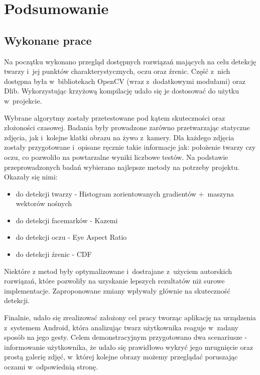 \newpage

\section{Podsumowanie}

\subsection{Wykonane prace}

Na początku wykonano przegląd dostępnych rozwiązań mających na celu detekcję twarzy i~jej punktów charakterystycznych, oczu oraz źrenic. Część z~nich dostępna była w~bibliotekach OpenCV (wraz z~dodatkowymi modułami) oraz Dlib. Wykorzystując krzyżową kompilację udało się je dostosować do użytku w~projekcie.

\par

Wybrane algorytmy zostały przetestowane pod kątem skuteczności oraz złożoności czasowej. Badania były prowadzone zarówno przetwarzając statyczne zdjęcia, jak i~kolejne klatki obrazu na żywo z~kamery. Dla każdego zdjęcia zostały przygotowane i~opisane ręcznie takie informacje jak: położenie twarzy czy oczu, co pozwoliło na powtarzalne wyniki liczbowe testów. Na podstawie przeprowadzonych badań wybierano najlepsze metody na potrzeby projektu. Okazały się nimi:

\begin{itemize}
    \item do detekcji twarzy - Histogram zorientowanych gradientów +~maszyna wektorów nośnych
    \item do detekcji facemarków - Kazemi
    \item do detekcji oczu - Eye Aspect Ratio
    \item do detekcji źrenic - CDF
\end{itemize}

\par

Niektóre z metod były optymalizowane i~dostrajane z~użyciem autorskich rozwiązań, które pozwoliły na uzyskanie lepszych rezultatów niż surowe implementacje. Zaproponowane zmiany wpływały głównie na skuteczność detekcji.

\par

Finalnie, udało się zrealizować założony cel pracy tworząc aplikację na urządzenia z~systemem Android, która analizując twarz użytkownika reaguje w~zadany sposób na jego gesty. Celem demonstracyjnym przygotowano dwa scenariusze - informowanie użytkownika, że udało się prawidłowo wykryć jego mrugnięcie oraz prostą galerię zdjęć, w~której kolejne obrazy możemy przeglądać poruszając oczami w~odpowiednią stronę. 

